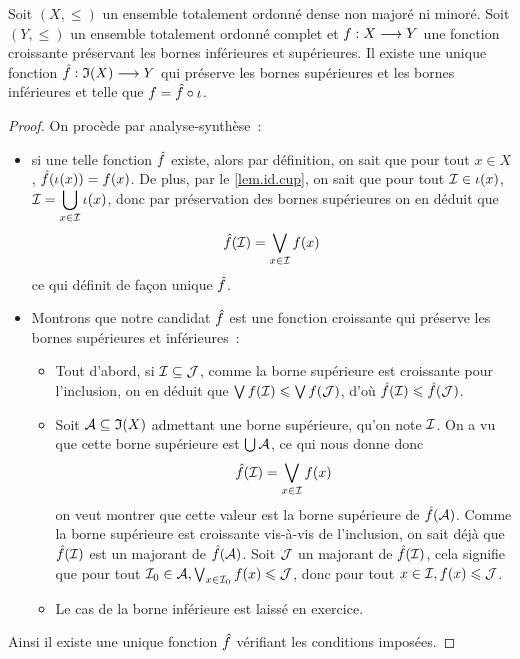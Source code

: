 \begin{theorem}
  Soit $(X,\leq)$ un ensemble totalement ordonné dense non majoré ni minoré.
  Soit $(Y,\leq)$ un ensemble totalement ordonné complet et
  $f : \displaystyle X \longrightarrow Y$ une fonction croissante préservant les bornes
  inférieures et supérieures. Il existe une unique fonction
  $\hat{f} : \displaystyle \mathfrak{I}(X) \longrightarrow Y$ qui préserve les bornes supérieures et
  les bornes inférieures et telle que $f = \hat{f} \circ \iota$.
\end{theorem}

\begin{proof}
  On procède par analyse-synthèse~:
  \begin{itemize}
  \item si une telle fonction $\hat{f}$ existe, alors par définition, on sait
    que pour tout $x\in X$, $\hat{f}(\iota(x)) = f(x)$. De plus, par le
    \cref{lem.id.cup}, on sait que pour tout $\mathcal{I}\in \iota(x)$,
    $\displaystyle \mathcal{I} = \bigcup_{x\in \mathcal{I}} \iota(x)$, donc par préservation
    des bornes supérieures on en déduit que
    \[\hat{f}(\mathcal{I}) = \bigvee_{x\in \mathcal{I}} f(x)\]
    ce qui définit de façon unique $\hat{f}$.
  \item Montrons que notre candidat $\hat{f}$ est une fonction croissante qui
    préserve les bornes supérieures et inférieures~:
    \begin{itemize}
    \item Tout d'abord, si
      $\mathcal{I}\subseteq \mathcal{J}$, comme la borne supérieure est croissante pour
      l'inclusion, on en déduit que $\bigvee f(\mathcal{I}) \leqslant \bigvee f(\mathcal{J})$,
      d'où $\hat{f}(\mathcal{I})\leqslant \hat{f}(\mathcal{J})$.
      
    \item Soit $\mathcal A\subseteq \mathfrak{I}(X)$ admettant une borne supérieure,
      qu'on note $\mathcal{I}$. On a vu que cette borne supérieure est
      $\bigcup \mathcal A$, ce qui nous donne donc
      \[\hat{f}(\mathcal{I}) = \bigvee_{x \in \mathcal{I}} f(x)\]
      on veut montrer que cette valeur est la borne supérieure de
      $\hat{f}(\mathcal A)$. Comme la borne supérieure est croissante vis-à-vis
      de l'inclusion, on sait déjà que $\hat{f}(\mathcal{I})$ est un majorant de
      $\hat{f}(\mathcal A)$.
      Soit $\mathcal{J}$ un majorant de $\hat{f}(\mathcal{I})$, cela signifie que pour
      tout $\mathcal{I}_0\in \mathcal A, \bigvee_{x \in \mathcal{I}_0} f(x) \leqslant \mathcal{J}$, donc
      pour tout $x \in \mathcal{I}, f(x) \leqslant \mathcal{J}$.
    \item Le cas de la borne inférieure est laissé en exercice.
    \end{itemize}
  \end{itemize}
  Ainsi il existe une unique fonction $\hat{f}$ vérifiant les conditions
  imposées.
\end{proof}

